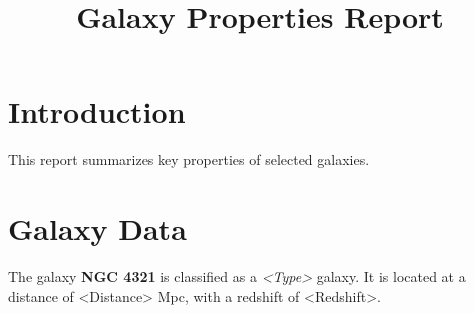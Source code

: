 \documentclass{article}
\title{Galaxy Properties Report}
\author{}
\date{}
\begin{document}
\maketitle

\section{Introduction}
This report summarizes key properties of selected galaxies.

\section{Galaxy Data}
The galaxy \textbf{NGC 4321} is classified as a \textit{<Type>} galaxy. 
It is located at a distance of <Distance> Mpc, with a redshift of <Redshift>.
\end{document}
